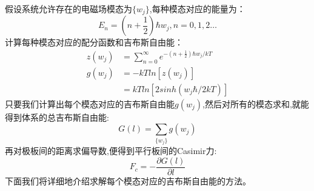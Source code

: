 \paragraph*{}
假设系统允许存在的电磁场模态为$\{w_j\}$,每种模态对应的能量为：
$$
E_n=(n+\frac{1}{2})\hbar w_j,n=0,1,2\dots
$$
计算每种模态对应的配分函数和吉布斯自由能：
\begin{equation*}
\begin{split}
z(w_j)&=\sum_{n=0}^{\infty}e^{-(n+\frac{1}{2})\hbar w_j/kT}\\
g(w_j) & =-kTln[z(w_j)]\\
& =kTln[2sinh(w_j\hbar/2kT)]
\end{split}
\end{equation*}
只要我们计算出每个模态对应的吉布斯自由能$g(w_j)$,然后对所有的模态求和,就能得到体系的总吉布斯自由能:
$$
G(l)=\sum_{\{w_j\}}g(w_j)
$$
再对极板间的距离求偏导数,便得到平行板间的Casimir力:
$$
F_c=-\frac{\partial G(l)}{\partial l}
$$
下面我们将详细地介绍求解每个模态对应的吉布斯自由能的方法。
